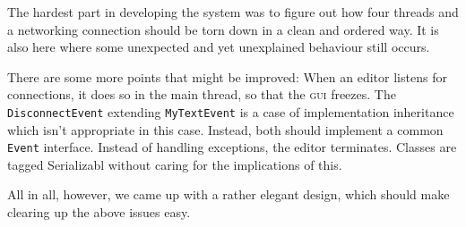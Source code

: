 \documentclass[a4paper,draft,12pt,oneside,article,table]{memoir}
\newcommand{\mil}[1]{\texttt{#1}}
\begin{document}
The hardest part in developing the system was to figure out how four
threads and a networking connection should be torn down in a clean and
ordered way. It is also here where some unexpected and yet unexplained
behaviour still occurs.

There are some more points that might be improved: When an editor
listens for connections, it does so in the main thread, so that the
\textsc{gui} freezes. The \mil{DisconnectEvent} extending
\mil{MyTextEvent} is a case of implementation inheritance which isn't
appropriate in this case. Instead, both should implement a common
\mil{Event} interface. Instead of handling exceptions, the editor
terminates. Classes are tagged Serializabl without caring for the
implications of this.

All in all, however, we came up with a rather elegant design, which
should make clearing up the above issues easy.

\end{document}

